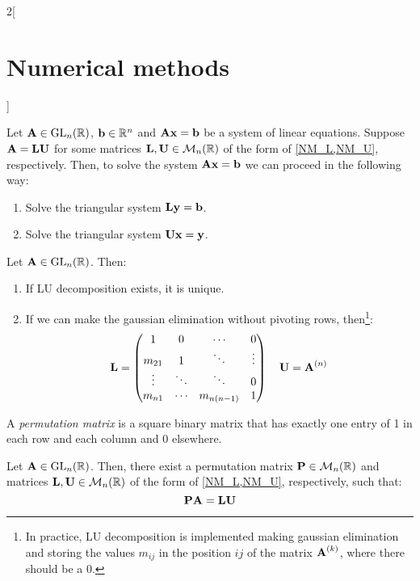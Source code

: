 \documentclass[../../../main.tex]{subfiles}
\begin{document}
\begin{multicols}{2}[\section{Numerical methods}]
\begin{lemma}
    Let $\boldsymbol{\mathrm{A}}\in\mathrm{GL}_n(\mathbb{R})$, $\boldsymbol{\mathrm{b}}\in\mathbb{R}^n$ and $\boldsymbol{\mathrm{A}}\boldsymbol{\mathrm{x}}=\boldsymbol{\mathrm{b}}$ be a system of linear equations. Suppose $\boldsymbol{\mathrm{A}}=\boldsymbol{\mathrm{L}}\boldsymbol{\mathrm{U}}$ for some matrices $\boldsymbol{\mathrm{L}},\boldsymbol{\mathrm{U}}\in\mathcal{M}_n(\mathbb{R})$ of the form of \cref{NM_L,NM_U}, respectively. Then, to solve the system $\boldsymbol{\mathrm{A}}\boldsymbol{\mathrm{x}}=\boldsymbol{\mathrm{b}}$ we can proceed in the following way:
    \begin{enumerate}
      \item Solve the triangular system $\boldsymbol{\mathrm{L}}\boldsymbol{\mathrm{y}}=\boldsymbol{\mathrm{b}}$.
      \item Solve the triangular system $\boldsymbol{\mathrm{U}}\boldsymbol{\mathrm{x}}=\boldsymbol{\mathrm{y}}$.
    \end{enumerate}
  \end{lemma}
  \begin{proposition}
    Let $\boldsymbol{\mathrm{A}}\in\mathrm{GL}_n(\mathbb{R})$. Then:
    \begin{enumerate}
      \item If LU decomposition exists, it is unique.
      \item If we can make the gaussian elimination without pivoting rows, then\footnote{In practice, LU decomposition is implemented making gaussian elimination and storing the values $m_{ij}$ in the position $ij$ of the matrix $\boldsymbol{\mathrm{A}}^{(k)}$, where there should be a 0.}:
            $$
              \boldsymbol{\mathrm{L}}=
              \begin{pmatrix}
                1      & 0      & \cdots     & 0      \\
                m_{21} & 1      & \ddots     & \vdots \\
                \vdots & \ddots & \ddots     & 0      \\
                m_{n1} & \cdots & m_{n(n-1)} & 1
              \end{pmatrix}\quad
              \boldsymbol{\mathrm{U}}=\boldsymbol{\mathrm{A}}^{(n)}
            $$
    \end{enumerate}
  \end{proposition}
  \begin{definition}
    A \emph{permutation matrix} is a square binary matrix that has exactly one entry of 1 in each row and each column and 0 elsewhere.
  \end{definition}
  \begin{proposition}
    Let $\boldsymbol{\mathrm{A}}\in\mathrm{GL}_n(\mathbb{R})$. Then, there exist a permutation matrix $\boldsymbol{\mathrm{P}}\in\mathcal{M}_n(\mathbb{R})$ and matrices $\boldsymbol{\mathrm{L}},\boldsymbol{\mathrm{U}}\in\mathcal{M}_n(\mathbb{R})$ of the form of \cref{NM_L,NM_U}, respectively, such that: $$\boldsymbol{\mathrm{P}}\boldsymbol{\mathrm{A}}=\boldsymbol{\mathrm{L}}\boldsymbol{\mathrm{U}}$$
  \end{proposition}
  \begin{definition}[QR descompostion]

\end{definition}
\end{multicols}
\end{document}
